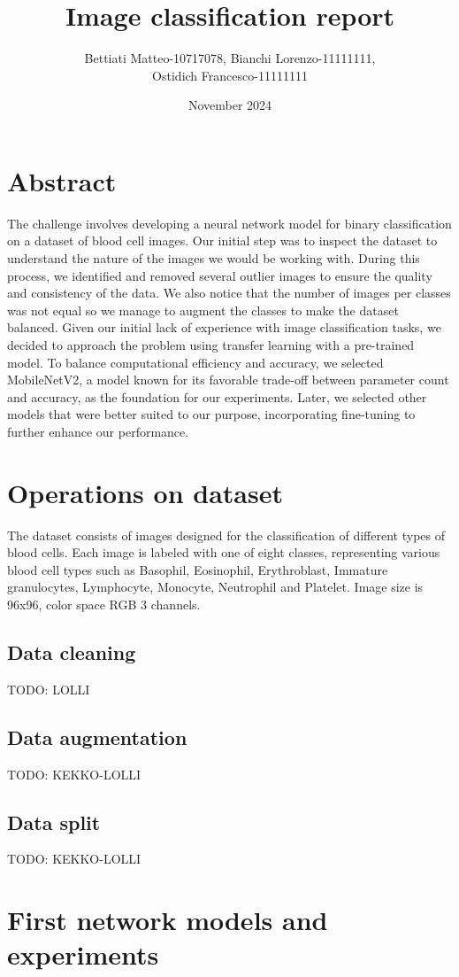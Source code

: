 \documentclass{article}
\title{\textbf{Image classification report}}
\author{Bettiati Matteo-10717078, Bianchi Lorenzo-11111111,\\ Ostidich Francesco-11111111}
\date{November 2024}
\begin{document}
\maketitle

\section{Abstract}
The challenge involves developing a neural network model for binary classification on a dataset of blood cell images. Our initial step was to inspect the dataset to understand the nature of the images we would be working with. During this process, we identified and removed several outlier images to ensure the quality and consistency of the data. We also notice that the number of images per classes was not equal so we manage to augment the classes to make the dataset balanced. Given our initial lack of experience with image classification tasks, we decided to approach the problem using transfer learning with a pre-trained model. To balance computational efficiency and accuracy, we selected MobileNetV2, a model known for its favorable trade-off between parameter count and accuracy, as the foundation for our experiments. Later, we selected other models that were better suited to our purpose, incorporating fine-tuning to further enhance our performance.

\section{Operations on dataset}
The dataset consists of images designed for the classification of different types of blood cells. Each image is labeled with one of eight classes, representing various blood cell types such as Basophil, Eosinophil, Erythroblast,  Immature granulocytes, Lymphocyte, Monocyte, Neutrophil and Platelet. Image size is 96x96, color space RGB 3 channels.
\subsection{Data cleaning}
TODO: LOLLI
\subsection{Data augmentation}
TODO: KEKKO-LOLLI
\subsection{Data split}
TODO: KEKKO-LOLLI

\section{First network models and experiments}
\end{document}

